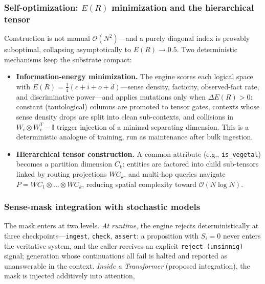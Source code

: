 \documentclass{article}
\providecommand{\tightlist}{%
  \setlength{\itemsep}{0pt}\setlength{\parskip}{0pt}}
\begin{document}
\hypertarget{self-optimization-er-minimization-and-the-hierarchical-tensor}{%
\subsubsection{\texorpdfstring{Self-optimization: \(E(R)\) minimization
and the hierarchical tensor
\label{app:er}}{Self-optimization: E(R) minimization and the hierarchical tensor }}\label{self-optimization-er-minimization-and-the-hierarchical-tensor}}

Construction is not manual \(\mathcal{O}(N^2)\)---and a purely diagonal
index is provably suboptimal, collapsing asymptotically to
\(E(R) \to 0.5\). Two deterministic mechanisms keep the substrate
compact:

\begin{itemize}
\tightlist
\item
  \textbf{Information-energy minimization.} The engine scores each
  logical space with \(E(R) = \frac{1}{4}(c + i + o + d)\)---sense
  density, facticity, observed-fact rate, and discriminative power---and
  applies mutations only when \(\Delta E(R) > 0\): constant
  (tautological) columns are promoted to tensor gates, contexts whose
  sense density drops are split into clean sub-contexts, and collisions
  in \(W_i \otimes W_i^{T} - \mathbb{I}\) trigger injection of a minimal
  separating dimension. This is a deterministic analogue of training,
  run as maintenance after bulk ingestion.
\item
  \textbf{Hierarchical tensor construction.} A common attribute (e.g.,
  \texttt{is\_vegetal}) becomes a partition dimension \(C_k\); entities
  are factored into child sub-tensors linked by routing projections
  \(WC_k\), and multi-hop queries navigate
  \(P = WC_1 \otimes \dots \otimes WC_k\), reducing spatial complexity
  toward \(\mathcal{O}(N \log N)\).
\end{itemize}

\hypertarget{sense-mask-integration-with-stochastic-models}{%
\subsubsection{\texorpdfstring{Sense-mask integration with stochastic
models
\label{app:mask}}{Sense-mask integration with stochastic models }}\label{sense-mask-integration-with-stochastic-models}}

The mask enters at two levels. \emph{At runtime}, the engine rejects
deterministically at three checkpoints---\texttt{ingest},
\texttt{check}, \texttt{assert}: a proposition with \(S_i = 0\) never
enters the veritative system, and the caller receives an explicit
\texttt{reject\ (unsinnig)} signal; generation whose continuations all
fail is halted and reported as unanswerable in the context. \emph{Inside
a Transformer} (proposed integration), the mask is injected additively
into attention,
\end{document}
